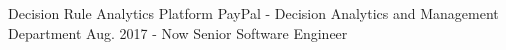 \documentclass[11pt, a4paper, UTF8]{awesome-cv}
\begin{document}
%
\begin{cventries}
  \cventry
    {Decision Rule Analytics Platform} %
    {PayPal - Decision Analytics and Management Department} %
    {Aug. 2017 - Now} %
    {Senior Software Engineer} %
    {
      \begin{cvitems} %

\end{cvitems}}
\end{cventries}
\end{document}
